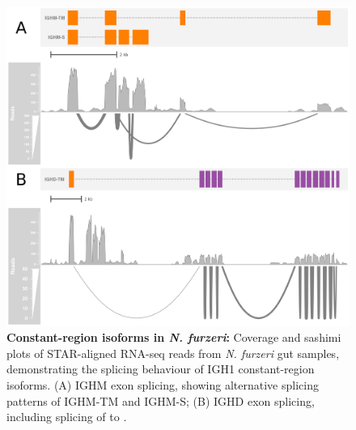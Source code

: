 	\begin{figure}
	\centering
		\begin{subfigure}{0em}
        \label{fig:nfu-locus-sashimi-a}
    \end{subfigure}
    \begin{subfigure}{0em}
        \label{fig:nfu-locus-sashimi-b}
    \end{subfigure}
	\includegraphics[width=\textwidth]{_Figures/png/nfu-locus-sashimi}
	\caption[Constant-region isoforms in \textit{N. furzeri}]{\textbf{Constant-region isoforms in \textit{N. furzeri}:} Coverage and sashimi plots of STAR-aligned RNA-seq reads from \textit{N. furzeri} gut samples, demonstrating the splicing behaviour of IGH1 constant-region isoforms. (A) IGHM exon splicing, showing alternative splicing patterns of IGHM-TM and IGHM-S; (B) IGHD exon splicing, including splicing of  to .}
	\label{fig:nfu-locus-sashimi}
	\end{figure}
	
